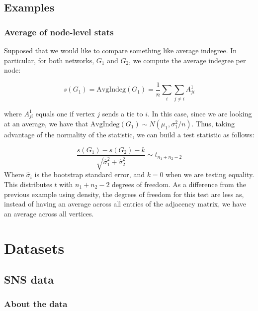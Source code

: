\documentclass[
]{book}
\begin{document}
\hypertarget{examples}{%
\section{Examples}\label{examples}}

\hypertarget{average-of-node-level-stats}{%
\subsection{Average of node-level stats}\label{average-of-node-level-stats}}

Supposed that we would like to compare something like average indegree.
In particular, for both networks, \(G_1\) and \(G_2\), we compute the average
indegree per node:

\[
s(G_1) = \mbox{AvgIndeg}(G_1) = \frac{1}{n}\sum_{i}\sum_{j\neq i}A^1_{ji}
\]

\noindent where \(A^1_{ji}\) equals one if vertex \(j\) sends a tie to \(i\). In this
case, since we are looking at an average, we have that
\(\mbox{AvgIndeg}(G_1) \sim N(\mu_1, \sigma^2_1/n)\). Thus, taking advantage of
the normality of the statistic, we can build a test statistic as follows:

\[
\frac{s(G_1) - s(G_2) - k}{\sqrt{\hat\sigma_{1}^2 + \hat\sigma_{2}^2}} \sim t_{n_1 + n_2 - 2}
\]
Where \(\hat\sigma_i\) is the bootstrap standard error, and \(k = 0\) when we are testing
equality. This distributes \(t\) with
\(n_1+n_2-2\) degrees of freedom. As a difference from the previous example using
density, the degrees of freedom for this test are less as, instead of having an
average across all entries of the adjacency matrix, we have an average across all
vertices.

\cleardoublepage

\hypertarget{appendix-appendix}{%
\appendix}


\hypertarget{datasets}{%
\chapter{Datasets}\label{datasets}}

\hypertarget{sns-data}{%
\section{SNS data}\label{sns-data}}

\hypertarget{about-the-data}{%
\subsection{About the data}\label{about-the-data}}
\end{document}
